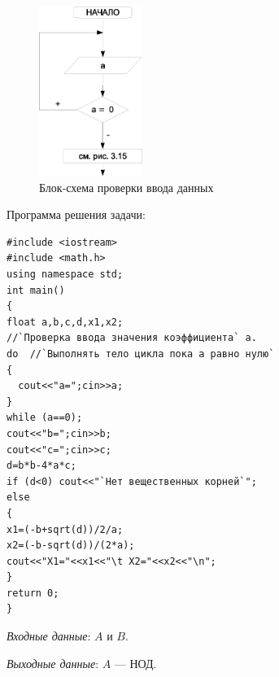 \begin{figure}[htb]
\begin{center}
\includegraphics[width=0.3\textwidth]{img/ris_3_27}
\caption{Блок-схема проверки ввода данных}
\label{ch03:refDrawing26}
\end{center}
\end{figure}

Программа решения задачи:
\begin{lstlisting}
#include <iostream>
#include <math.h>
using namespace std;
int main()
{
float a,b,c,d,x1,x2;
//`Проверка ввода значения коэффициента` a.
do  //`Выполнять тело цикла пока а равно нулю`
{
  cout<<"a=";cin>>a;
}
while (a==0);
cout<<"b=";cin>>b;
cout<<"c=";cin>>c;
d=b*b-4*a*c;
if (d<0) cout<<"`Нет вещественных корней`";
else
{
x1=(-b+sqrt(d))/2/a;
x2=(-b-sqrt(d))/(2*a);
cout<<"X1="<<x1<<"\t X2="<<x2<<"\n";
}
return 0;
}
\end{lstlisting}


\emph{Входные данные}: $A$ и $B$.

\emph{Выходные данные}: $A$ --- НОД.

